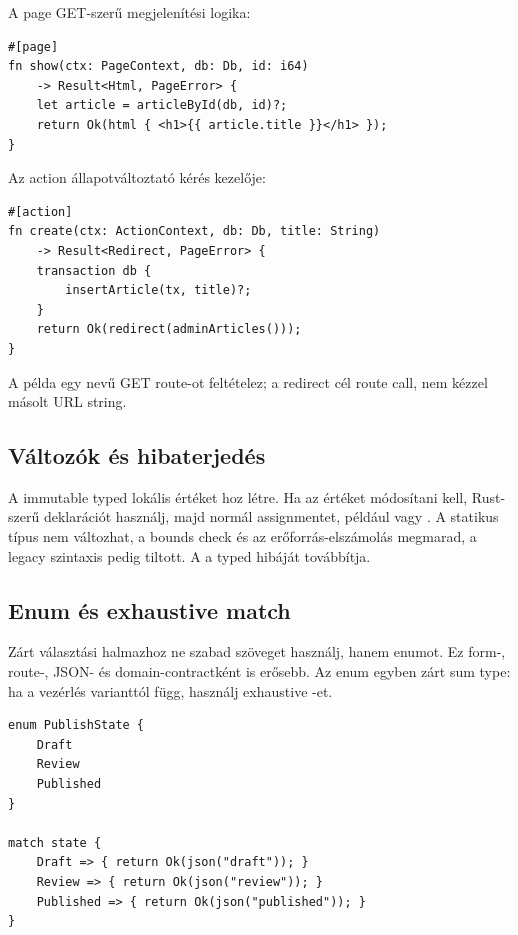 A page GET-szerű megjelenítési logika:

\begin{lstlisting}[language=Velran]
#[page]
fn show(ctx: PageContext, db: Db, id: i64)
    -> Result<Html, PageError> {
    let article = articleById(db, id)?;
    return Ok(html { <h1>{{ article.title }}</h1> });
}
\end{lstlisting}

Az action állapotváltoztató kérés kezelője:

\begin{lstlisting}[language=Velran]
#[action]
fn create(ctx: ActionContext, db: Db, title: String)
    -> Result<Redirect, PageError> {
    transaction db {
        insertArticle(tx, title)?;
    }
    return Ok(redirect(adminArticles()));
}
\end{lstlisting}

A példa egy  nevű GET route-ot feltételez; a redirect cél route call, nem kézzel másolt URL string.

\subsection*{Változók és hibaterjedés}

A  immutable typed lokális értéket hoz létre. Ha az értéket módosítani kell, Rust-szerű  deklarációt használj, majd normál assignmentet, például  vagy . A statikus típus nem változhat, a bounds check és az erőforrás-elszámolás megmarad, a legacy  szintaxis pedig tiltott. A  a typed  hibáját továbbítja.

\subsection*{Enum és exhaustive match}

Zárt választási halmazhoz ne szabad szöveget használj, hanem enumot. Ez form-, route-, JSON- és domain-contractként is erősebb. Az enum egyben zárt sum type: ha a vezérlés varianttól függ, használj exhaustive -et.

\begin{lstlisting}[language=Velran]
enum PublishState {
    Draft
    Review
    Published
}

match state {
    Draft => { return Ok(json("draft")); }
    Review => { return Ok(json("review")); }
    Published => { return Ok(json("published")); }
}
\end{lstlisting}

